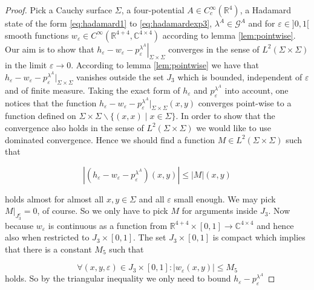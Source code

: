 \documentclass[b5paper,draft,openbib,12pt]{memoir}
\begin{document}
  

\begin{proof}


Pick a Cauchy surface \(\Sigma\), a four-potential \(A \in C_c^\infty(\mathbb{R}^4)\), a Hadamard state of the form 
  \eqref{eq:hadamard1} to \eqref{eq:hadamardexp3}, \(\lambda^A\in\mathcal{G}^A\)
  and for \(\varepsilon \in]0,1[\) smooth functions \(w_\varepsilon \in C^\infty(\mathbb{R}^{4+4},\mathbb{C}^{4\times 4})\)
  according to lemma \ref{lem:pointwise}. 
Our aim is to show that 
\(\left.h_\varepsilon - w_\varepsilon -p_\varepsilon^{\lambda^A} \right|_{\Sigma\times\Sigma}\) converges in the 
sense of \(L^2(\Sigma\times\Sigma)\) in the limit \(\varepsilon\rightarrow 0\).
According to lemma \ref{lem:pointwise} we have that
  \(h_\varepsilon-w_\varepsilon-p^{\lambda^A}_{\varepsilon}|_{\Sigma\times \Sigma}\) vanishes 
  outside the set \(J_3\) which is bounded, independent of \(\varepsilon\) and of finite measure. 
  Taking the exact form of \(h_\varepsilon\) and \(p^{\lambda^A}_\varepsilon\) into account,
  one notices that the function \(h_\varepsilon-w_\varepsilon-p^{\lambda^A}_{\varepsilon}|_{\Sigma\times \Sigma} (x,y)\) converges point-wise to a function defined
  on \(\Sigma\times\Sigma \backslash \{(x,x)\mid x\in \Sigma\}\). In order to show that the convergence also holds in the sense of \(L^2(\Sigma\times\Sigma)\) we
  would like to use dominated convergence. Hence we should find a function \(M\in L^2(\Sigma\times\Sigma)\) such that 
  

\begin{equation}\label{eq: def bound}
\left|  (h_\varepsilon-w_\varepsilon-p^{\lambda^A}_{\varepsilon})(x,y)\right|\le |M|(x,y)
\end{equation}
  
  holds almost for almost all \(x,y\in\Sigma\) and all \(\varepsilon\) small enough. We may pick \(\left. M\right|_{J_3^c}=0\), of course. 
So we only have to pick \(M\) for arguments inside \(J_3\). Now because \(w_\varepsilon\) is continuous as a function from 
\(\mathbb{R}^{4+4}\times [0,1]\rightarrow \mathbb{C}^{4\times 4}\) and hence also when restricted to \(J_3\times[0,1]\). The 
set \(J_3\times[0,1]\) is compact which implies that there is a constant \(M_5\) such that

\begin{equation}
\forall (x,y,\varepsilon)\in J_3\times[0,1]: |w_\varepsilon(x,y)|\le M_5
\end{equation}
holds. So by the triangular inequality we only need to bound \(h_\varepsilon-p_\varepsilon^{\lambda^A}\)


\end{proof}
\end{document}
